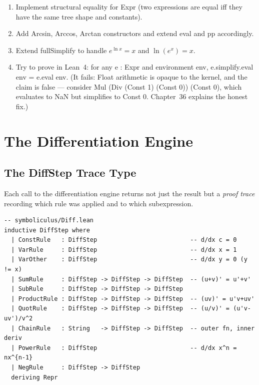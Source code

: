 \documentclass[12pt, openany]{book}
\theoremstyle{plain}
\theoremstyle{definition}
\theoremstyle{remark}
\newcommand{\li}[1]{{\ttfamily\small\color{tealaccent}#1}}
\begin{document}
\begin{exbox}
\begin{enumerate}
  \item Implement structural equality for \li{Expr} (two expressions are equal iff
        they have the same tree shape and constants).
  \item Add \li{Arcsin}, \li{Arccos}, \li{Arctan} constructors and extend
        \li{eval} and \li{pp} accordingly.
  \item Extend \li{fullSimplify} to handle $e^{\ln x}=x$ and $\ln(e^x)=x$.
  \item Try to prove in Lean~4: for any \li{e : Expr} and environment \li{env},
        \li{e.simplify.eval env = e.eval env}.  (It fails: Float arithmetic is opaque to
        the kernel, and the claim is false --- consider
        \li{Mul (Div (Const 1) (Const 0)) (Const 0)}, which evaluates to NaN but
        simplifies to \li{Const 0}.  Chapter~36 explains the honest fix.)
\end{enumerate}
\end{exbox}
\color{black}

\chapter{The Differentiation Engine}
\color{black}

\section{The \li{DiffStep} Trace Type}

Each call to the differentiation engine returns not just the result but a
\emph{proof trace} recording which rule was applied and to which subexpression.

\begin{leanbox}
\begin{lstlisting}
-- symboliculus/Diff.lean
inductive DiffStep where
  | ConstRule   : DiffStep                          -- d/dx c = 0
  | VarRule     : DiffStep                          -- d/dx x = 1
  | VarOther    : DiffStep                          -- d/dx y = 0 (y != x)
  | SumRule     : DiffStep -> DiffStep -> DiffStep  -- (u+v)' = u'+v'
  | SubRule     : DiffStep -> DiffStep -> DiffStep
  | ProductRule : DiffStep -> DiffStep -> DiffStep  -- (uv)' = u'v+uv'
  | QuotRule    : DiffStep -> DiffStep -> DiffStep  -- (u/v)' = (u'v-uv')/v^2
  | ChainRule   : String   -> DiffStep -> DiffStep  -- outer fn, inner deriv
  | PowerRule   : DiffStep                          -- d/dx x^n = nx^{n-1}
  | NegRule     : DiffStep -> DiffStep
  deriving Repr
\end{lstlisting}
\end{leanbox}
\color{black}
\end{document}
